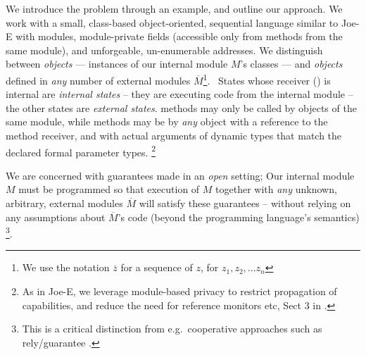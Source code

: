  \newcommand{\pwd}{key}

\renewcommand{\password}{key\xspace}

We introduce the problem  through an example, and outline our
approach.  We work with a  small, class-based object-oriented, sequential language similar to Joe-E \cite{JoeE} with modules,   module-private fields
({accessible} only from   methods {from} the same module),
and unforgeable, un-enumerable addresses.
We distinguish between  \emph{\internalO  objects} --- instances of our internal module $M$'s classes ---
and \emph{\externalO  objects} defined in
\emph{any} number of external modules $\overline M$\footnote{We use the notation $\overline z$ for a sequence of $z$, \ie for $z_1,z_2,...z_n$ }.~ 
States whose receiver () is internal are \emph{internal states} -- they are executing code from the internal module -- the other states are  \emph{external states}.
{ methods  {may only be} called by objects of the same
  module,  while   methods  may be  by \emph{any}
  object with a reference to the method receiver, {and with
  actual arguments of  dynamic types that match} the declared formal parameter types.} 
\footnote{As in Joe-E, we leverage  module-based privacy to restrict propagation of capabilities, and reduce the need for reference monitors etc, \cf Sect 3 in  \cite{JoeE}.}   

 \label{s:concepts}
 
We are concerned with guarantees made in an \emph{open} setting; %
Our internal module
$M$ must be programmed so that 
  execution of $M$  together with \emph{any} unknown, arbitrary, external modules $\overline M$
will satisfy these guarantees --
without relying on any assumptions about $\overline M$'s code
(beyond the programming language's semantics) 
\footnote{
This is a critical distinction from e.g.\
cooperative approaches such as rely/guarantee
\cite{relyGuarantee-HayesJones-setss2017,relyGuarantee-vanStaden-mpc2015}.}.
  
